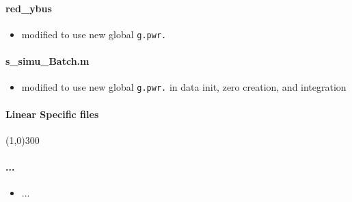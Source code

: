 \documentclass[12pt]{article}
\begin{document}
\paragraph{red\_ybus}
	\begin{itemize}
		\item modified to use new global \verb|g.pwr.|
	\end{itemize}
\paragraph{s\_simu\_Batch.m}
	\begin{itemize}
		\item modified to use new global \verb|g.pwr.| in data init, zero creation, and integration
	\end{itemize}
	

\paragraph{Linear Specific files}\line(1,0){300}

\paragraph{...}
	\begin{itemize}
		\item ...
	\end{itemize}

\end{document}
